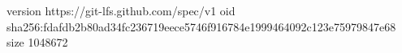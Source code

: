 version https://git-lfs.github.com/spec/v1
oid sha256:fdafdb2b80ad34fc236719eece5746f916784e1999464092c123e75979847e68
size 1048672
